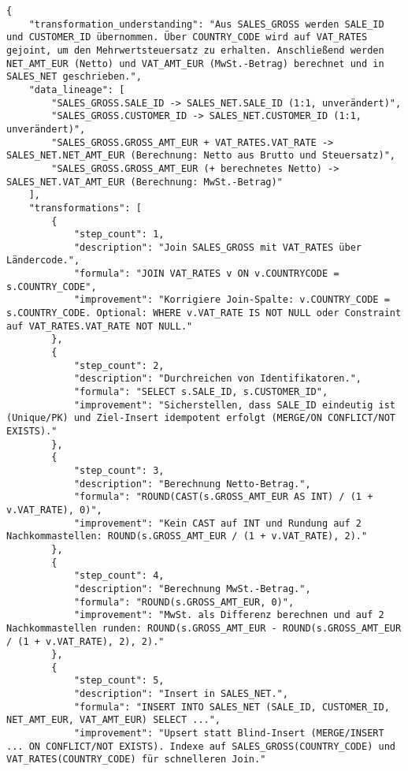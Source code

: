 \begin{lstlisting}[caption={Ausgabe: GPT-5 Anwendungsfall 5 Robustheitsdurchlauf},label={gpt_case5_prompt3}]
{
    "transformation_understanding": "Aus SALES_GROSS werden SALE_ID und CUSTOMER_ID übernommen. Über COUNTRY_CODE wird auf VAT_RATES gejoint, um den Mehrwertsteuersatz zu erhalten. Anschließend werden NET_AMT_EUR (Netto) und VAT_AMT_EUR (MwSt.-Betrag) berechnet und in SALES_NET geschrieben.",
    "data_lineage": [
        "SALES_GROSS.SALE_ID -> SALES_NET.SALE_ID (1:1, unverändert)",
        "SALES_GROSS.CUSTOMER_ID -> SALES_NET.CUSTOMER_ID (1:1, unverändert)",
        "SALES_GROSS.GROSS_AMT_EUR + VAT_RATES.VAT_RATE -> SALES_NET.NET_AMT_EUR (Berechnung: Netto aus Brutto und Steuersatz)",
        "SALES_GROSS.GROSS_AMT_EUR (+ berechnetes Netto) -> SALES_NET.VAT_AMT_EUR (Berechnung: MwSt.-Betrag)"
    ],
    "transformations": [
        {
            "step_count": 1,
            "description": "Join SALES_GROSS mit VAT_RATES über Ländercode.",
            "formula": "JOIN VAT_RATES v ON v.COUNTRYCODE = s.COUNTRY_CODE",
            "improvement": "Korrigiere Join-Spalte: v.COUNTRY_CODE = s.COUNTRY_CODE. Optional: WHERE v.VAT_RATE IS NOT NULL oder Constraint auf VAT_RATES.VAT_RATE NOT NULL."
        },
        {
            "step_count": 2,
            "description": "Durchreichen von Identifikatoren.",
            "formula": "SELECT s.SALE_ID, s.CUSTOMER_ID",
            "improvement": "Sicherstellen, dass SALE_ID eindeutig ist (Unique/PK) und Ziel-Insert idempotent erfolgt (MERGE/ON CONFLICT/NOT EXISTS)."
        },
        {
            "step_count": 3,
            "description": "Berechnung Netto-Betrag.",
            "formula": "ROUND(CAST(s.GROSS_AMT_EUR AS INT) / (1 + v.VAT_RATE), 0)",
            "improvement": "Kein CAST auf INT und Rundung auf 2 Nachkommastellen: ROUND(s.GROSS_AMT_EUR / (1 + v.VAT_RATE), 2)."
        },
        {
            "step_count": 4,
            "description": "Berechnung MwSt.-Betrag.",
            "formula": "ROUND(s.GROSS_AMT_EUR, 0)",
            "improvement": "MwSt. als Differenz berechnen und auf 2 Nachkommastellen runden: ROUND(s.GROSS_AMT_EUR - ROUND(s.GROSS_AMT_EUR / (1 + v.VAT_RATE), 2), 2)."
        },
        {
            "step_count": 5,
            "description": "Insert in SALES_NET.",
            "formula": "INSERT INTO SALES_NET (SALE_ID, CUSTOMER_ID, NET_AMT_EUR, VAT_AMT_EUR) SELECT ...",
            "improvement": "Upsert statt Blind-Insert (MERGE/INSERT ... ON CONFLICT/NOT EXISTS). Indexe auf SALES_GROSS(COUNTRY_CODE) und VAT_RATES(COUNTRY_CODE) für schnelleren Join."

\end{lstlisting}
